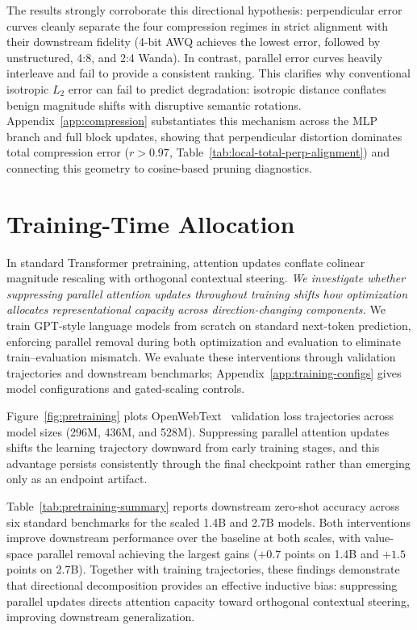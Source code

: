 The results strongly corroborate this directional hypothesis: perpendicular error
curves cleanly separate the four compression regimes in strict alignment with their
downstream fidelity (4-bit AWQ achieves the lowest error, followed by unstructured,
4:8, and 2:4 Wanda). In contrast, parallel error curves heavily interleave and fail
to provide a consistent ranking. This clarifies why conventional isotropic $L_2$ error
can fail to predict degradation: isotropic distance conflates benign magnitude shifts
with disruptive semantic rotations. Appendix~\ref{app:compression} substantiates
this mechanism across the MLP branch and full block updates, showing that perpendicular
distortion dominates total compression error ($r > 0.97$, Table~\ref{tab:local-total-perp-alignment})
and connecting this geometry to cosine-based pruning diagnostics.

\section{Training-Time Allocation}
\label{sec:pretraining}

In standard Transformer pretraining, attention updates conflate colinear magnitude
rescaling with orthogonal contextual steering. \textit{We investigate whether suppressing
parallel attention updates throughout training shifts how optimization allocates
representational capacity across direction-changing components.} We train GPT-style
language models from scratch on standard next-token prediction, enforcing parallel
removal during both optimization and evaluation to eliminate train--evaluation mismatch.
We evaluate these interventions through validation trajectories and downstream
benchmarks; Appendix~\ref{app:training-configs} gives model configurations and
gated-scaling controls.

Figure~\ref{fig:pretraining} plots OpenWebText~\citep{Gokaslan2019OpenWeb} validation loss
trajectories across model sizes (296M, 436M, and 528M). Suppressing parallel
attention updates shifts the learning trajectory downward from early training
stages, and this advantage persists consistently through the final checkpoint
rather than emerging only as an endpoint artifact.

Table~\ref{tab:pretraining-summary} reports downstream zero-shot accuracy across
six standard benchmarks for the scaled 1.4B and 2.7B models. Both interventions
improve downstream performance over the baseline at both scales, with value-space
parallel removal achieving the largest gains ($+0.7$ points on 1.4B and $+1.5$ points on 2.7B).
Together with training trajectories, these findings demonstrate that
directional decomposition provides an effective inductive bias: suppressing
parallel updates directs attention capacity toward orthogonal contextual steering,
improving downstream generalization.

